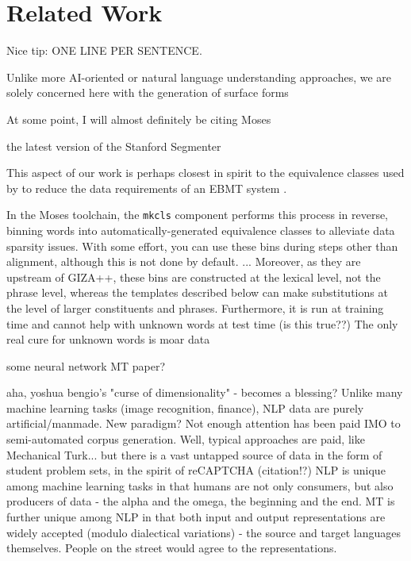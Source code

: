  








\section{Related Work}
\label{sec:related}

Nice tip: ONE LINE PER SENTENCE.

Unlike more AI-oriented or natural language understanding approaches, we are solely concerned here with the generation of surface forms

At some point, I will almost definitely be citing Moses 

the latest version of the Stanford Segmenter 

This aspect of our work is perhaps closest in spirit to the equivalence classes used by  to reduce the data requirements of an EBMT system .

In the Moses toolchain, the {\small \tt mkcls} component  performs this process in reverse, binning words into automatically-generated equivalence classes to alleviate data sparsity issues.
With some effort, you can use these bins during steps other than alignment, although this is not done by default.
...
Moreover, as they are upstream of GIZA++, these bins are constructed at the lexical level, not the phrase level, whereas the templates described below can make substitutions at the level of larger constituents and phrases.
Furthermore, it is run at training time and cannot help with unknown words at test time (is this true??)
The only real cure for unknown words is moar data


some neural network MT paper?

aha, yoshua bengio's "curse of dimensionality" - becomes a blessing?  
Unlike many machine learning tasks (image recognition, finance), NLP data are purely artificial/manmade.  New paradigm?  Not enough attention has been paid IMO to semi-automated corpus generation.  Well, typical approaches are paid, like Mechanical Turk... but there is a vast untapped source of data in the form of student problem sets, in the spirit of reCAPTCHA (citation!?)
NLP is unique among machine learning tasks in that humans are not only consumers, but also producers of data - the alpha and the omega, the beginning and the end.
MT is further unique among NLP in that both input and output representations are widely accepted (modulo dialectical variations) - the source and target languages themselves.
People on the street would agree to the representations.


